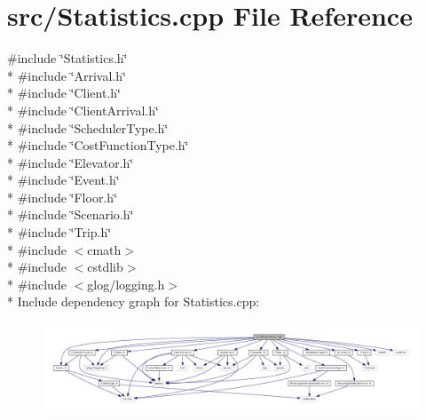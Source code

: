 \section{src/\+Statistics.cpp File Reference}
\label{_statistics_8cpp}
{\ttfamily \#include \char`\"{}Statistics.\+h\char`\"{}}\\*
{\ttfamily \#include \char`\"{}Arrival.\+h\char`\"{}}\\*
{\ttfamily \#include \char`\"{}Client.\+h\char`\"{}}\\*
{\ttfamily \#include \char`\"{}Client\+Arrival.\+h\char`\"{}}\\*
{\ttfamily \#include \char`\"{}Scheduler\+Type.\+h\char`\"{}}\\*
{\ttfamily \#include \char`\"{}Cost\+Function\+Type.\+h\char`\"{}}\\*
{\ttfamily \#include \char`\"{}Elevator.\+h\char`\"{}}\\*
{\ttfamily \#include \char`\"{}Event.\+h\char`\"{}}\\*
{\ttfamily \#include \char`\"{}Floor.\+h\char`\"{}}\\*
{\ttfamily \#include \char`\"{}Scenario.\+h\char`\"{}}\\*
{\ttfamily \#include \char`\"{}Trip.\+h\char`\"{}}\\*
{\ttfamily \#include $<$cmath$>$}\\*
{\ttfamily \#include $<$cstdlib$>$}\\*
{\ttfamily \#include $<$glog/logging.\+h$>$}\\*
Include dependency graph for Statistics.\+cpp\+:\nopagebreak
\begin{figure}[H]
\begin{center}
\leavevmode
\includegraphics[width=350pt]{_statistics_8cpp__incl}
\end{center}
\end{figure}

